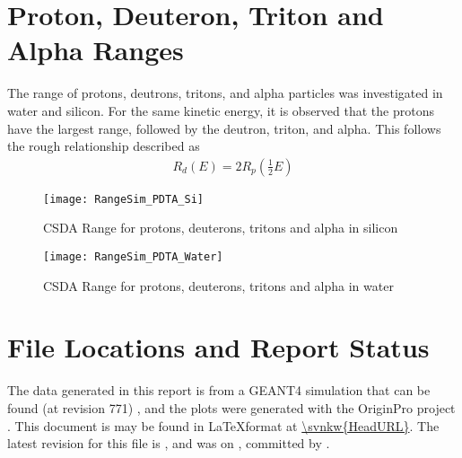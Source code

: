 \documentclass[draftcls,onecolumn]{IEEEtran}
\begin{document}
\section{Proton, Deuteron, Triton and Alpha Ranges}
\label{sec:PDTA}
The range of protons, deutrons, tritons, and alpha particles was investigated in water and silicon.
For the same kinetic energy, it is observed that the protons have the largest range, followed by the deutron, triton, and alpha.
This follows the rough relationship described as
\begin{align}
  R_d(E) = 2 R_p\left(\frac{1}{2}E\right)
  
\end{align}
\begin{figure}
  \texttt{[image: RangeSim\_PDTA\_Si]}
  \caption[CSDA Range for Differnet Charged Particles in Si]{CSDA Range for protons, deuterons, tritons and alpha in silicon}
  \label{fig:CSDARangePDTASi}
\end{figure}
\begin{figure}
  \texttt{[image: RangeSim\_PDTA\_Water]}
  \caption[CSDA Range for Differnet Charged Particles in Water]{CSDA Range for protons, deuterons, tritons and alpha in water}
  \label{fig:CSDARangePDTAWater}
\end{figure}

\section{File Locations and Report Status}
The data generated in this report is from a GEANT4 simulation that can be found (at revision 771) , and the plots were generated with the OriginPro project .
This document is may be found in \LaTeX format at \url{\svnkw{HeadURL}}.  
The latest revision for this file is \svnrev, and was on \svndate, committed by \svnauthor.
\end{document}

